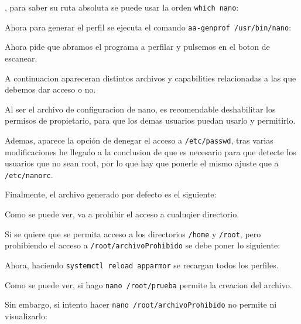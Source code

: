 \documentclass{article}
\begin{document}
, para saber su ruta absoluta se puede usar la orden \verb|which nano|:


Ahora para generar el perfil se ejecuta el comando \verb|aa-genprof /usr/bin/nano|:


Ahora pide que abramos el programa a perfilar y pulsemos en el boton de escanear.


A continuacion apareceran distintos archivos y capabilities relacionadas a las que debemos dar acceso o no.


Al ser el archivo de configuracion de nano, es recomendable deshabilitar los permisos de propietario, para que los demas usuarios puedan usarlo y permitirlo.

Ademas, aparece la opción de denegar el acceso a \verb|/etc/passwd|, tras varias modificaciones he llegado a la conclusion de que es necesario para que detecte los usuarios que no sean root, por lo que hay que ponerle el mismo ajuste que a \verb|/etc/nanorc|.


Finalmente, el archivo generado por defecto es el siguiente:


Como se puede ver, va a prohibir el acceso a cualuqier directorio.


Si se quiere que se permita acceso a los directorios \verb|/home| y \verb|/root|, pero prohibiendo el acceso a \verb|/root/archivoProhibido| se debe poner lo siguiente:


Ahora, haciendo \verb|systemctl reload apparmor| se recargan todos los perfiles.


Como se puede ver, si hago \verb|nano /root/prueba| permite la creacion del archivo.


Sin embargo, si intento hacer \verb|nano /root/archivoProhibido| no permite ni visualizarlo:

\end{document}
